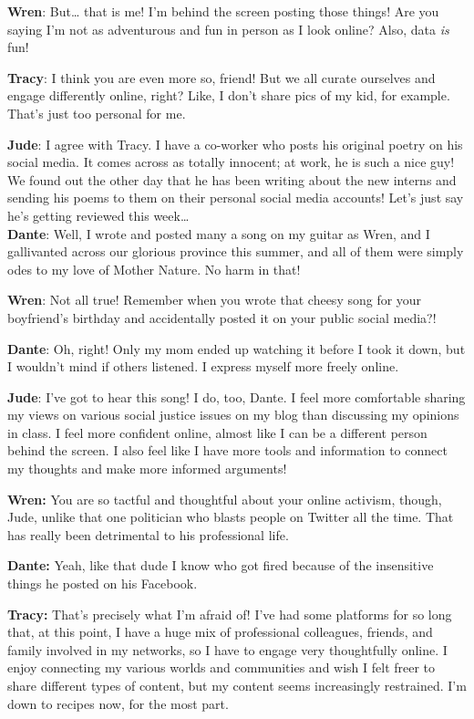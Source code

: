 \documentclass[
  letterpaper,
  DIV=11,
  numbers=noendperiod]{scrreprt}
\begin{document}
\textbf{Wren}: But\ldots{} that is me! I'm behind the screen posting
those things! Are you saying I'm not as adventurous and fun in person as
I look online? Also, data \emph{is} fun!

\textbf{Tracy}: I think you are even more so, friend! But we all curate
ourselves and engage differently online, right? Like, I don't share pics
of my kid, for example. That's just too personal for me.

\textbf{Jude}: I agree with Tracy. I have a co-worker who posts his
original poetry on his social media. It comes across as totally
innocent; at work, he is such a nice guy! We found out the other day
that he has been writing about the new interns and sending his poems to
them on their personal social media accounts! Let's just say he's
getting reviewed this week\ldots{}\\

\textbf{Dante}: Well, I wrote and posted many a song on my guitar as
Wren, and I gallivanted across our glorious province this summer, and
all of them were simply odes to my love of Mother Nature. No harm in
that!

\textbf{Wren}: Not all true! Remember when you wrote that cheesy song
for your boyfriend's birthday and accidentally posted it on your public
social media?!

\textbf{Dante}: Oh, right! Only my mom ended up watching it before I
took it down, but I wouldn't mind if others listened. I express myself
more freely online.

\textbf{Jude}: I've got to hear this song! I do, too, Dante. I feel more
comfortable sharing my views on various social justice issues on my blog
than discussing my opinions in class. I feel more confident online,
almost like I can be a different person behind the screen. I also feel
like I have more tools and information to connect my thoughts and make
more informed arguments!

\textbf{Wren:} You are so tactful and thoughtful about your online
activism, though, Jude, unlike that one politician who blasts people on
Twitter all the time. That has really been detrimental to his
professional life.

\textbf{Dante:} Yeah, like that dude I know who got fired because of the
insensitive things he posted on his Facebook.

\textbf{Tracy:} That's precisely what I'm afraid of! I've had some
platforms for so long that, at this point, I have a huge mix of
professional colleagues, friends, and family involved in my networks, so
I have to engage very thoughtfully online. I enjoy connecting my various
worlds and communities and wish I felt freer to share different types of
content, but my content seems increasingly restrained. I'm down to
recipes now, for the most part.
\end{document}
